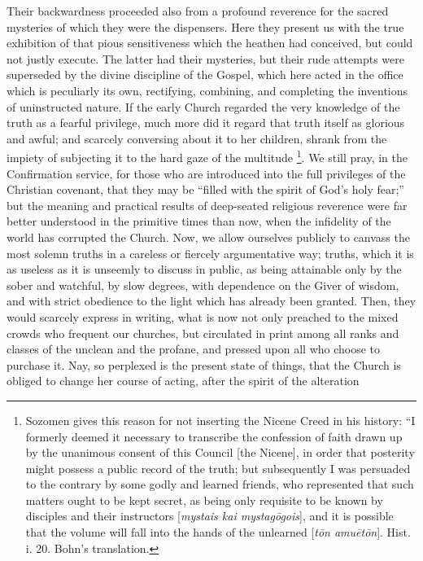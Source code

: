 Their backwardness proceeded also from a profound reverence for the
sacred mysteries of which they were the dispensers. Here they present
us with the true exhibition of that pious sensitiveness which
the heathen had conceived, but could not justly execute. The latter
had their mysteries, but their rude attempts were superseded by the
divine discipline of the Gospel, which here acted in the office which
is peculiarly its own, rectifying, combining, and completing the
inventions of uninstructed nature. If the early Church regarded the
very knowledge of the truth as a fearful privilege, much more did it
regard that truth itself as glorious and awful; and scarcely
conversing about it to her children, shrank from the impiety of
subjecting it to the hard gaze of the multitude \footnote{Sozomen gives this reason for not inserting
the Nicene Creed in his history: ``I formerly deemed it necessary
to transcribe the confession of faith drawn up by the unanimous
consent of this Council [the Nicene], in order that posterity might
possess a public record of the truth; but subsequently I was persuaded
to the contrary by some godly and learned friends, who represented
that such matters ought to be kept secret, as being only requisite to
be known by disciples and their instructors [\emph{mystais kai mystag\={o}gois}],
and it is possible that the volume will fall into the hands of the
unlearned [\emph{t\={o}n amu\={e}t\={o}n}]. Hist. i. 20. Bohn's
translation.}. We still pray, in the Confirmation service, for those who are
introduced into the full privileges of the Christian covenant, that
they may be ``filled with the spirit of God's holy fear;'' but
the meaning and practical results of deep-seated religious reverence
were far better understood in the primitive times than now, when the
infidelity of the world has corrupted the Church. Now, we allow
ourselves publicly to canvass the most solemn truths in a careless or
fiercely argumentative way; truths, which it is as useless as it is
unseemly to discuss in public, as being attainable only by the sober
and watchful, by slow degrees, with dependence on the Giver of
wisdom, and with strict obedience to the light which has already been
granted. Then, they would scarcely express in writing, what is now not
only preached to the mixed crowds who frequent our churches, but
circulated in print among all ranks and classes of the unclean and the
profane, and pressed upon all who choose to purchase it. Nay, so
perplexed is the present state of things, that the Church is obliged
to change her course of acting, after the spirit of the alteration
